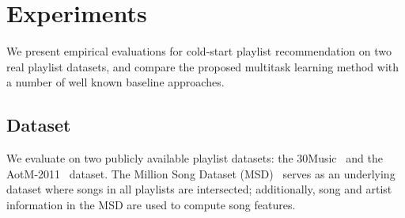 \section{Experiments}
\label{sec:experiment}

We present empirical evaluations for cold-start playlist recommendation on two real playlist datasets,
and compare the proposed multitask learning method with a number of well known baseline approaches.


\subsection{Dataset}
We evaluate on 
two publicly available playlist datasets: the 30Music~\cite{30music2015} and 
the AotM-2011~\cite{mcfee2012hypergraph} dataset.
The Million Song Dataset (MSD)~\cite{msd2011} serves as an underlying dataset where songs in all playlists 
are intersected; additionally, song and artist information in the MSD are used to compute song features.

 



